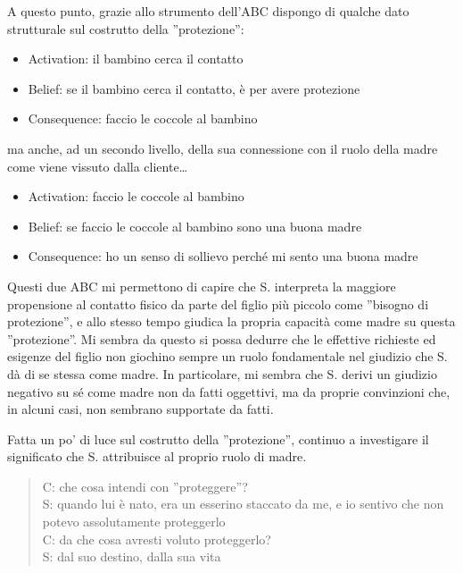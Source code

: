 \noindent  A questo punto, grazie allo strumento dell'ABC  dispongo di  qualche dato strutturale sul costrutto della ''protezione'':
\begin{itemize}
\item Activation: il bambino cerca il contatto
\item Belief: se il bambino cerca il contatto, è per avere protezione
\item Consequence: faccio le coccole al bambino
\end{itemize}

\noindent ma anche, ad un secondo livello, della sua connessione con il ruolo della madre come viene vissuto dalla cliente\ldots

\begin{itemize}
\item Activation: faccio le coccole al bambino
\item Belief: se faccio le coccole al bambino sono una buona madre
\item Consequence: ho un senso di sollievo perché mi sento una buona madre
\end{itemize}

\noindent Questi due ABC  mi permettono di capire che S. interpreta la maggiore propensione al contatto fisico da parte del figlio più piccolo come ''bisogno di protezione'', e allo stesso tempo giudica la propria capacità come madre su questa ''protezione''.
Mi sembra da questo si possa dedurre che le effettive richieste ed esigenze del figlio non giochino sempre un ruolo fondamentale nel giudizio che S. dà di se stessa come madre. In particolare, mi sembra che S. derivi un giudizio negativo su sé come madre non da fatti oggettivi, ma da proprie convinzioni che, in alcuni casi, non sembrano supportate da fatti.

Fatta un po' di luce sul costrutto della ''protezione'', continuo a investigare il significato che S. attribuisce al proprio ruolo di madre.

\begin{verse}
C: che cosa intendi con ''proteggere''?\\
S: quando lui è nato, era un esserino staccato da me, e io sentivo che non potevo assolutamente proteggerlo\\
C: da che cosa avresti voluto proteggerlo?\\
S: dal suo destino, dalla sua vita\\
\end{verse}

